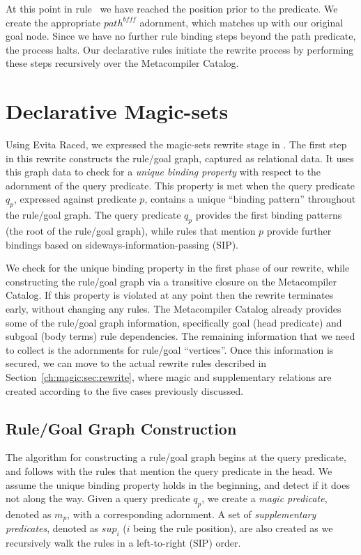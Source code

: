 At this point in rule~ we have reached the position prior to the
 predicate.  We create the appropriate $path^{bfff}$ adornment, which
matches up with our original  goal node.  Since we have no further
rule binding steps beyond the path predicate, the process halts.  Our
declarative rules initiate the rewrite process by performing these steps
recursively over the Metacompiler Catalog.

\section{Declarative Magic-sets}
\label{ch:magic:sec:rules}

Using Evita Raced, we expressed the magic-sets rewrite stage in \OVERLOG.  The
first step in this rewrite constructs the rule/goal graph, captured as
relational data.  It uses this graph data to check for a {\em unique binding
property} with respect to the adornment of the query predicate.  This property
is met when the query predicate $q_p$, expressed against predicate $p$,
contains a unique ``binding pattern'' throughout the rule/goal graph.  The
query predicate $q_p$ provides the first binding patterns (the root of the
rule/goal graph), while rules that mention $p$ provide further bindings based
on sideways-information-passing (SIP).

We check for the unique binding property in the first phase of our rewrite,
while constructing the rule/goal graph via a transitive closure on the
Metacompiler Catalog.  If this property is violated at any point then the
rewrite terminates early, without changing any rules.  The Metacompiler Catalog
already provides some of the rule/goal graph information, specifically goal
(head predicate) and subgoal (body terms) rule dependencies.  The remaining
information that we need to collect is the adornments for rule/goal
``vertices''.  Once this information is secured, we can move to the actual
rewrite rules described in Section~\ref{ch:magic:sec:rewrite}, where magic and
supplementary relations are created according to the five cases previously
discussed.

\subsection{Rule/Goal Graph Construction}
\label{ch:magic:sec:rgconstruct}

The algorithm for constructing a rule/goal graph begins at the query predicate,
and follows with the rules that mention the query predicate in the head.  We
assume the unique binding property holds in the beginning, and detect if it
does not along the way.  Given a query predicate $q_p$, we create a {\em magic
predicate}, denoted as $m_p$, with a corresponding adornment.  A set of {\em
supplementary predicates}, denoted as $sup_i$ ($i$ being the rule position),
are also created as we recursively walk the rules in a left-to-right (SIP)
order.


